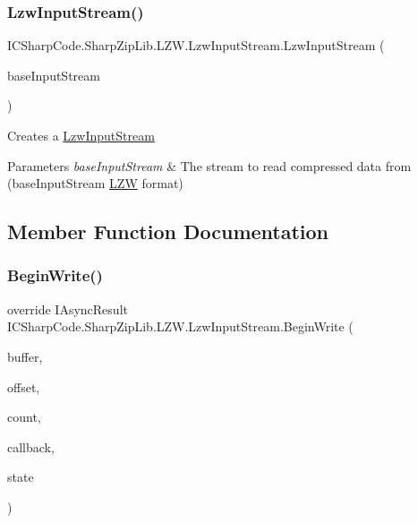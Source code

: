 \subsubsection{\texorpdfstring{Lzw\+Input\+Stream()}{LzwInputStream()}}
{\footnotesize\ttfamily I\+C\+Sharp\+Code.\+Sharp\+Zip\+Lib.\+L\+Z\+W.\+Lzw\+Input\+Stream.\+Lzw\+Input\+Stream (\begin{DoxyParamCaption}\item[{Stream}]{base\+Input\+Stream }\end{DoxyParamCaption})\hspace{0.3cm}{\ttfamily [inline]}}



Creates a \hyperlink{class_i_c_sharp_code_1_1_sharp_zip_lib_1_1_l_z_w_1_1_lzw_input_stream}{Lzw\+Input\+Stream} 


\begin{DoxyParams}{Parameters}
{\em base\+Input\+Stream} & The stream to read compressed data from (base\+Input\+Stream \hyperlink{namespace_i_c_sharp_code_1_1_sharp_zip_lib_1_1_l_z_w}{L\+ZW} format) \\
\hline
\end{DoxyParams}


\subsection{Member Function Documentation}
\mbox{\label{class_i_c_sharp_code_1_1_sharp_zip_lib_1_1_l_z_w_1_1_lzw_input_stream_a5facdd338f00c41aaca0b618b1d1c2b3}} 
\subsubsection{\texorpdfstring{Begin\+Write()}{BeginWrite()}}
{\footnotesize\ttfamily override I\+Async\+Result I\+C\+Sharp\+Code.\+Sharp\+Zip\+Lib.\+L\+Z\+W.\+Lzw\+Input\+Stream.\+Begin\+Write (\begin{DoxyParamCaption}\item[{byte \mbox{[}$\,$\mbox{]}}]{buffer,  }\item[{int}]{offset,  }\item[{int}]{count,  }\item[{Async\+Callback}]{callback,  }\item[{object}]{state }\end{DoxyParamCaption})\hspace{0.3cm}{\ttfamily [inline]}}



